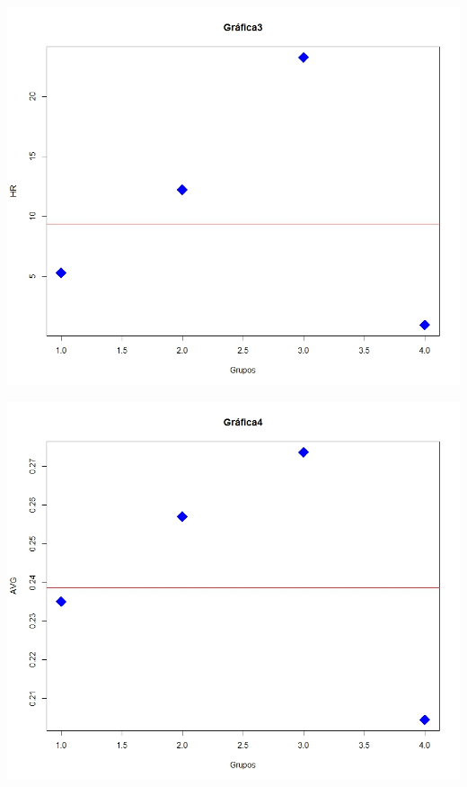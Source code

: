 \documentclass[11pt,letterpaper]{report}
\begin{document}
\begin{center}
    	\includegraphics[scale=0.4]{Grafica3.jpeg} \vspace{1.5cm}
    	
    	\includegraphics[scale=0.4]{Grafica4.jpeg} \vspace{1.5cm}
    	

\end{center}
\end{document}
